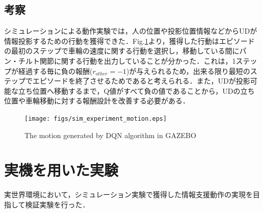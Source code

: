 \documentclass[12pt]{sonota/aislab}
\begin{document}


\subsection{考察}
シミュレーションによる動作実験では，人の位置や投影位置情報などからUDが情報投影するための行動を獲得できた．Fig.\ref{sim_experiment_motion}より，獲得した行動はエピソードの最初のステップで車輪の速度に関する行動を選択し，移動している間にパン・チルト関節に関する行動を出力していることが分かった．これは，1ステップが経過する毎に負の報酬($r_{other}=-1$)が与えられるため，出来る限り最短のステップでエピソードを終了させるためであると考えられる．また，UDが投影可能な立ち位置へ移動するまで，Q値がすべて負の値であることから，UDの立ち位置や車輪移動に対する報酬設計を改善する必要がある．

\begin{figure}[t]
\begin{center}
\texttt{[image: figs/sim\_experiment\_motion.eps]}
\caption{The motion generated by DQN algorithm in GAZEBO}
\label{sim_experiment_motion}
\end{center}
\end{figure}

\clearpage

\section{実機を用いた実験}
実世界環境において，シミュレーション実験で獲得した情報支援動作の実現を目指して検証実験を行った．
\end{document}
